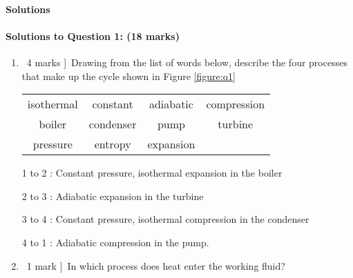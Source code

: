 \documentclass[a4paper,12pt,fleqn]{article}
\begin{document}
\newpage
\paragraph{\textbf{Solutions} \ }

\paragraph{\textbf{Solutions to Question 1: (18 marks)}}
\begin{enumerate}[label=\alph*)]
\item \lbrack\ 4 marks ]\ Drawing from the list of words below, describe the four processes that make up the cycle shown in Figure \ref{figure:q1}\par
\begin{table}[h]
\centering
\begin{tabular}{c c c c}
isothermal & constant & adiabatic & compression\\
boiler & condenser & pump & turbine \\ 
pressure & entropy & expansion&\\
\end{tabular}
\end{table}
\par
1 to 2 : Constant pressure, isothermal expansion in the boiler\par
2 to 3 : Adiabatic expansion in the turbine\par
3 to 4 : Constant pressure, isothermal compression in the condenser\par
4 to 1 : Adiabatic compression in the pump.\par
\item \lbrack\ 1 mark ]\ In which process does heat enter the working fluid?\par


\end{enumerate}
\end{document}
